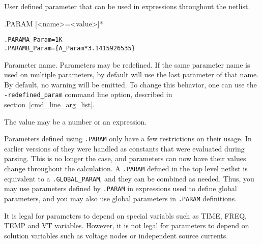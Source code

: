 



User defined parameter that can be used in expressions throughout the netlist.

\begin{Command}

\format
.PARAM [<name>=<value>]*

\examples
\begin{alltt}
.PARAM A_Param=1K
.PARAM B_Param=\{A_Param*3.1415926535\}
\end{alltt}

\arguments

\begin{Arguments}


Parameter name.  Parameters may be redefined.  
If the same parameter name is used on multiple parameters, \Xyce{} by default will use the last parameter of that name.  By default, no warning will be emitted.
To change this behavior, one can use the \texttt{-redefined\_param} command line option, described in section~\ref{cmd_line_arg_list}.


The value may be a number or an expression.
\end{Arguments}

\comments
Parameters defined using \texttt{.PARAM} only have a few restrictions on their 
  usage.  In earlier versions of \Xyce{} they were handled as constants that 
  were evaluated during parsing.  This is no longer the case, and parameters 
  can now have their values change throughout the calculation.   A \texttt{.PARAM} 
  defined in the top level netlist is equivalent to 
  a \texttt{.GLOBAL\_PARAM}, and they can be combined as needed.
Thus, you may use parameters defined by \texttt{.PARAM} in expressions used to
define global parameters, and you may also use global parameters in
\texttt{.PARAM} definitions.  

It is legal for parameters to depend on special variabls such as 
  TIME, FREQ, TEMP and VT variables.  However, it is not legal for parameters 
  to depend on solution variables such as voltage nodes or independent source currents.


\end{Command}
